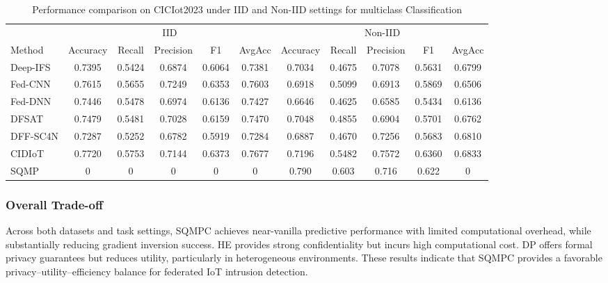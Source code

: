 \documentclass[journal,twoside,web]{ieeecolor}
\begin{document}
\begin{table}[t]
\centering
\caption{Performance comparison on CICIot2023 under IID and Non-IID settings for multiclass Classification}
\label{tab:results}
\small
\begin{tabular}{lccccc ccccc}
\toprule
& \multicolumn{5}{c}{ IID} & \multicolumn{5}{c}{ Non-IID} \\
\cmidrule(lr){2-6} \cmidrule(lr){7-11}
Method 
& Accuracy & Recall & Precision & F1 & AvgAcc 
& Accuracy & Recall & Precision & F1 & AvgAcc \\
\midrule

Deep-IFS \cite{10376416} 
& 0.7395 & 0.5424 & 0.6874 & 0.6064 & 0.7381 
& 0.7034 & 0.4675 & 0.7078 & 0.5631 & 0.6799 \\

Fed-CNN \cite{10376416} 
& 0.7615 & 0.5655 & 0.7249 & 0.6353 & 0.7603 
& 0.6918 & 0.5099 & 0.6913 & 0.5869 & 0.6506 \\

Fed-DNN \cite{10376416}  
& 0.7446 & 0.5478 & 0.6974 & 0.6136 & 0.7427 
& 0.6646 & 0.4625 & 0.6585 & 0.5434 & 0.6136 \\

DFSAT \cite{10376416}  
& 0.7479 & 0.5481 & 0.7028 & 0.6159 & 0.7470 
& 0.7048 & 0.4855 & 0.6904 & 0.5701 & 0.6762 \\

DFF-SC4N \cite{10376416} 
& 0.7287 & 0.5252 & 0.6782 & 0.5919 & 0.7284 
& 0.6887 & 0.4670 & 0.7256 & 0.5683 & 0.6810 \\

CIDIoT \cite{10376416} 
& 0.7720 & 0.5753 & 0.7144 & 0.6373 & 0.7677 
& 0.7196 & 0.5482 & 0.7572 & 0.6360 & 0.6833 \\

\midrule
SQMP 
& 0 & 0 & 0 & 0 & 0 
& 0.790 & 0.603 & 0.716 & 0.622 & 0 \\

\bottomrule
\end{tabular}
\end{table}



\subsubsection*{Overall Trade-off}

Across both datasets and task settings, SQMPC achieves near-vanilla predictive performance with limited computational overhead, while substantially reducing gradient inversion success. HE provides strong confidentiality but incurs high computational cost. DP offers formal privacy guarantees but reduces utility, particularly in heterogeneous environments. These results indicate that SQMPC provides a favorable privacy–utility–efficiency balance for federated IoT intrusion detection.
\end{document}
